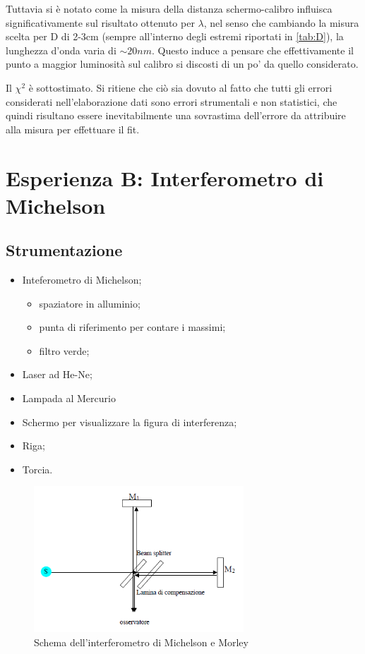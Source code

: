 \documentclass[a4paper,10pt]{article}
\begin{document}
{{{{Tuttavia si è notato come la misura della distanza schermo-calibro influisca significativamente sul risultato ottenuto per $\lambda$, nel senso che cambiando la misura scelta per D di 2-3cm (sempre all'interno degli estremi riportati in \ref{tab:D}), la lunghezza d'onda varia di $\sim 20nm$. Questo induce a pensare che effettivamente il punto a maggior luminosità sul calibro si discosti di un po' da quello considerato.

Il $\chi^2$ è sottostimato. Si ritiene che ciò sia dovuto al fatto che tutti gli errori considerati nell'elaborazione dati sono errori strumentali e non statistici, che quindi risultano essere inevitabilmente una sovrastima dell'errore da attribuire alla misura per effettuare il fit.

 

\section{Esperienza B: Interferometro di Michelson}

\subsection{Strumentazione}

\begin{itemize}
	\item Inteferometro di Michelson;
	\begin{itemize}
		\item spaziatore in alluminio;
		\item punta di riferimento per contare i massimi;
		\item filtro verde;		
	\end{itemize}
	\item Laser ad He-Ne;
	\item Lampada al Mercurio
	\item Schermo per visualizzare la figura di interferenza;
	\item Riga;
	\item Torcia.
\end{itemize}

\begin{figure}[H]
	\centering
	\includegraphics[width=0.7\textwidth]{../grafici/MichelsonMorley.png}
	\caption{Schema dell'interferometro di Michelson e Morley}
	\label{fig:MMint}
\end{figure}

}}}}
\end{document}

